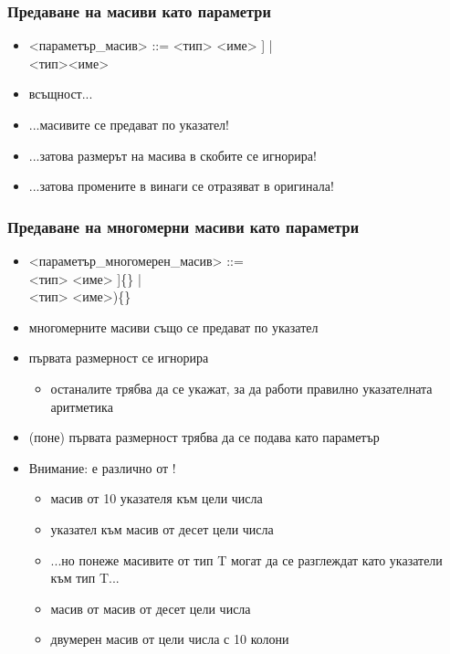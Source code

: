 \documentclass[alsotrans]{beamerswitch}
\begin{document}
\begin{frame}
  \frametitle{Предаване на масиви като параметри}

  \small
  \begin{itemize}[<+->]
  \item{} <параметър\_масив> ::= <тип> <име> \tta[[<константен\_израз>]\tta] |\\
    \hspace{26ex}<тип>\tta* <име>
  \item всъщност...
  \item ...масивите се предават \alert{по указател}!
  \item ...затова размерът на масива в скобите се игнорира!
  \item ...затова промените в винаги се отразяват в оригинала!
  \end{itemize}
\end{frame}

\begin{frame}
  \frametitle{Предаване на многомерни масиви като параметри}

  \small
  \begin{itemize}[<+->]
  \item{} <параметър\_многомерен\_масив> ::= \\
    \hspace{10ex}<тип> <име> \tta[[<константа>]\tta]\{\} |\\
    \hspace{10ex}<тип> \tta{(*}<име>\tta)\{\}
    \item многомерните масиви също се предават по указател
    \item първата размерност се игнорира
      \begin{itemize}
      \item останалите трябва да се укажат, за да работи правилно указателната аритметика
      \end{itemize}
    \item (поне) първата размерност трябва да се подава като параметър
    \item \alert{Внимание:}  \alert{е различно от}
      !
      \begin{itemize}
      \item {} \eqv масив от 10 указателя към цели числа
      \item {} \eqv указател към масив от десет цели
        числа
      \item ...но понеже масивите от тип T могат да се разглеждат като
        указатели към тип T...
      \item {} \eqv масив от масив от десет цели числа
      \item {} \eqv двумерен масив от цели числа с 10
        колони
      \end{itemize}
  \end{itemize}
\end{frame}
\end{document}

